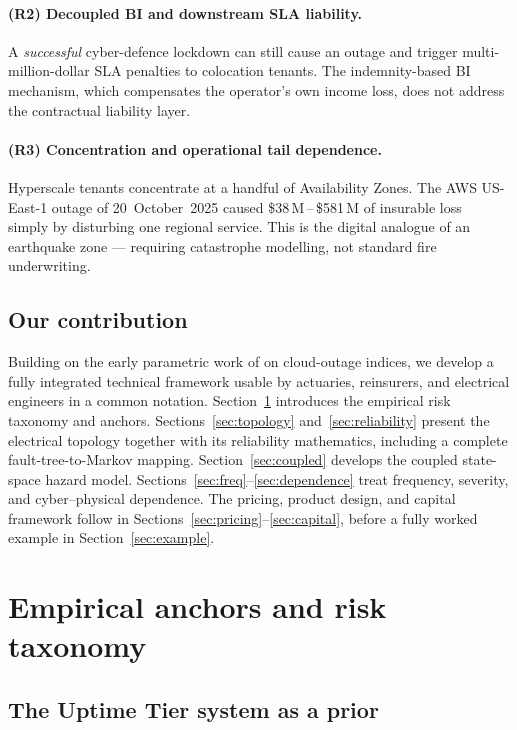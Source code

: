 \documentclass[11pt,a4paper]{article}
\let\origsection\section
\renewcommand{\section}{\clearpage\origsection}
\theoremstyle{ia}
\newcommand{\1}{\mathbf{1}}
\begin{document}
\paragraph{(R2) Decoupled BI and downstream SLA liability.} A
\emph{successful} cyber-defence lockdown can still cause an outage and
trigger multi-million-dollar SLA penalties to colocation tenants. The
indemnity-based BI mechanism, which compensates the operator's own
income loss, does not address the contractual liability layer.

\paragraph{(R3) Concentration and operational tail dependence.}
Hyperscale tenants concentrate at a handful of Availability Zones. The
AWS US-East-1 outage of 20~October~2025 caused
\$38\,M\,--\,\$581\,M of insurable loss~\citep{CyberCube2025} simply by
disturbing one regional service. This is the digital analogue of an
earthquake zone --- requiring catastrophe modelling, not standard fire
underwriting.

\subsection{Our contribution}

Building on the early parametric work of \citet{Parametrix2022}
on cloud-outage indices, we develop a fully integrated technical
framework usable by actuaries, reinsurers, and electrical
engineers in a common notation. Section~\ref{sec:taxonomy} introduces
the empirical risk taxonomy and anchors. Sections~\ref{sec:topology}
and~\ref{sec:reliability} present the electrical topology together with
its reliability mathematics, including a complete fault-tree-to-Markov
mapping. Section~\ref{sec:coupled} develops the coupled state-space
hazard model. Sections~\ref{sec:freq}--\ref{sec:dependence} treat
frequency, severity, and cyber--physical dependence. The pricing,
product design, and capital framework follow in
Sections~\ref{sec:pricing}--\ref{sec:capital}, before a fully worked
example in Section~\ref{sec:example}.

\section{Empirical anchors and risk taxonomy}\label{sec:taxonomy}

\subsection{The Uptime Tier system as a prior}\label{ss:tiers}
\end{document}
